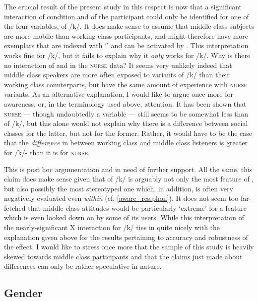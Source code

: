 The crucial result of the present study in this respect is now that a significant interaction of  condition and  of the participant could only be identified for one of the four variables,  of /k/.
It does make sense to assume that middle class subjects are more mobile than working class participants, and might therefore have more exemplars that are indexed with `' and can be activated by .
This interpretation works fine for /k/, but it fails to explain why it \emph{only} works for /k/.
Why is there no interaction of  and  in the \textsc{nurse} data?
It seems very unlikely indeed that middle class speakers are more often exposed to  variants of /k/ than their working class counterparts, but have the same amount of experience with  \textsc{nurse} variants.
As an alternative explanation, I would like to argue once more for awareness, or, in the terminology used above, attention.
It has been shown that \textsc{nurse} --- though undoubtedly a  variable --- still seems to be somewhat less  than  of /k/, but this alone would not explain why there is a difference between social classes for the latter, but not for the former.
Rather, it would have to be the case that the \emph{difference} in  between working class and middle class listeners is greater for /k/- than it is for \textsc{nurse}.

This is post hoc argumentation and in need of further support.
All the same, this claim does make sense given that  of /k/ is arguably not only the most  feature of , but also possibly the most stereotyped one which, in addition, is often very negatively evaluated even \emph{within}  (cf. \ref{aware_res.phon}).
It does not seem too far-fetched that middle class attitudes would be particularly `extreme' for a feature which is even looked down on by some of its users.
While this interpretation of the nearly-significant  X  interaction for /k/ ties in quite nicely with the explanation given above for the results pertaining to accuracy and robustness of the  effect, I would like to stress once more that the sample of this study is heavily skewed towards middle class participants and that the claims just made about  differences can only be rather speculative in nature.

		\subsection{Gender}

